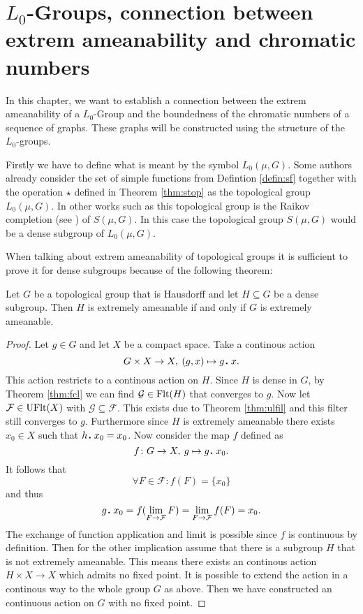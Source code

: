 \section{$L_0$-Groups, connection between extrem ameanability and chromatic numbers}\label{sec:l0groups}
In this chapter, we want to establish a connection between the extrem ameanability of a $L_0$-Group and the boundedness of the chromatic numbers of a sequence of graphs.
These graphs will be constructed using the structure of the $L_0$-groups.

Firstly we have to define what is meant by the symbol $L_0(\mu, G)$. Some authors already consider the set of simple functions from Defintion \ref{defin:sf} together with the operation $\star$ defined in Theorem \ref{thm:stop} as the topological group $L_0(\mu, G)$. In other works such as \cite{sl2024} this topological group is the Raikov completion (see \cite[Chapter 3.6]{atop2008}) of $S(\mu, G)$. In this case the topological group $S(\mu, G)$ would be a dense subgroup of $L_0(\mu, G)$.   

When talking about extrem ameanability of topological groups it is sufficient to prove it for dense subgroups because of the following theorem: 
\begin{thm}\label{thm:da}
  Let $G$ be a topological group that is Hausdorff and let $H \subseteq G$ be a dense subgroup. Then $H$ is extremely ameanable if and only if $G$ is extremely ameanable. 
\end{thm}

\begin{proof}
  Let $g \in G$ and let $X$ be a compact space. Take a continous action \[G \times X \to X, \: (g, x) \mapsto g \anddot x.\] This action restricts to a continous action on $H$. Since $H$ is dense in $G$, by Theorem \ref{thm:fcl} we can find $\mathcal{G} \in {\rm Flt}(H)$ that converges to $g$. Now let $\mathcal{F} \in {\rm UFlt}(X)$ with $\mathcal{G} \subseteq \mathcal{F}$. This exists due to Theorem \ref{thm:ulfil} and this filter still converges to $g$. Furthermore since $H$ is extremely ameanable there exists $x_0 \in X$ such that $h \anddot x_0 = x_0$. Now consider the map $f$ defined as \[f\colon G \to X, \: g \mapsto g\anddot x_0.\] It follows that \[\forall F\in \mathcal{F}\colon f(F) = \{x_0\}\] and thus \[g\anddot x_0 = f(\lim\limits_{F \to \mathcal{F}}F) = \lim\limits_{F\to \mathcal{F}} f(F) = x_0.\] The exchange of function application and limit is possible since $f$ is continuous by definition.
  Then for the other implication assume that there is a subgroup $H$ that is not extremely ameanable. This means there exists an continous action $H \times X \to X$ which admits no fixed point. It is possible to extend the action in a continous way to the whole group $G$ as above. Then we have constructed an continuous action on $G$ with no fixed point.
\end{proof}

